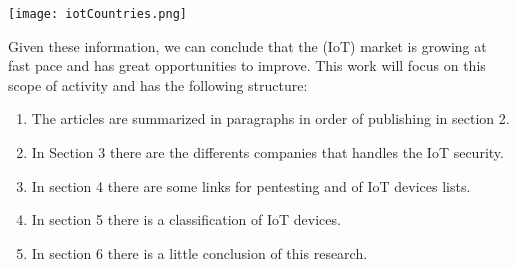  \texttt{[image: iotCountries.png]}

Given these information, we can conclude that the (IoT) market is growing at fast pace and has great opportunities to improve. This work will focus on this scope of activity and has the following structure:
\begin{enumerate}
	\item The articles are summarized in paragraphs in order of publishing in section 2.
	\item In Section 3 there are the differents companies that handles the IoT security.
	\item In section 4 there are some links for pentesting and of IoT devices lists.
	\item In section 5 there is a classification of IoT devices.
	\item In section 6 there is a little conclusion of this research.
\end{enumerate}
